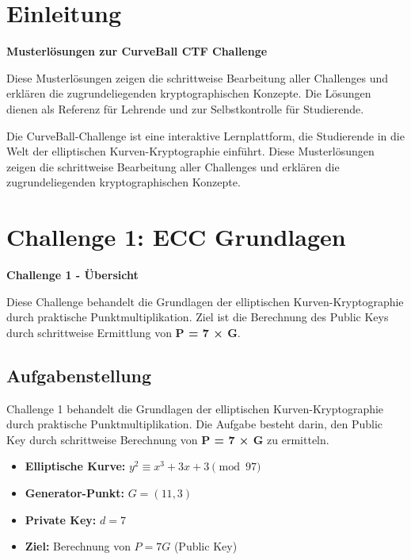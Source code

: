 \documentclass{article}
\begin{document}
\section{Einleitung}

\begin{infobox}
\textbf{Musterlösungen zur CurveBall CTF Challenge}

Diese Musterlösungen zeigen die schrittweise Bearbeitung aller Challenges und erklären die zugrundeliegenden kryptographischen Konzepte. Die Lösungen dienen als Referenz für Lehrende und zur Selbstkontrolle für Studierende.
\end{infobox}

Die CurveBall-Challenge ist eine interaktive Lernplattform, die Studierende in die Welt der elliptischen Kurven-Kryptographie einführt. Diese Musterlösungen zeigen die schrittweise Bearbeitung aller Challenges und erklären die zugrundeliegenden kryptographischen Konzepte.

\vspace{0.5cm}

\section{Challenge 1: ECC Grundlagen}

\begin{solutionbox}
\textbf{Challenge 1 - Übersicht}

Diese Challenge behandelt die Grundlagen der elliptischen Kurven-Kryptographie durch praktische Punktmultiplikation. Ziel ist die Berechnung des Public Keys durch schrittweise Ermittlung von \textbf{P = 7 × G}.
\end{solutionbox}

\subsection{Aufgabenstellung}
Challenge 1 behandelt die Grundlagen der elliptischen Kurven-Kryptographie durch praktische Punktmultiplikation. Die Aufgabe besteht darin, den Public Key durch schrittweise Berechnung von \textbf{P = 7 × G} zu ermitteln.

\begin{tcolorbox}[colback=thd-blue!10,colframe=thd-blue,title=\textbf{Gegebene Parameter}]
\begin{itemize}[leftmargin=1.5cm]
    \item \textbf{Elliptische Kurve:} $y^2 \equiv x^3 + 3x + 3 \pmod{97}$
    \item \textbf{Generator-Punkt:} $G = (11, 3)$
    \item \textbf{Private Key:} $d = 7$
    \item \textbf{Ziel:} Berechnung von $P = 7G$ (Public Key)
\end{itemize}
\end{tcolorbox}
\end{document}
